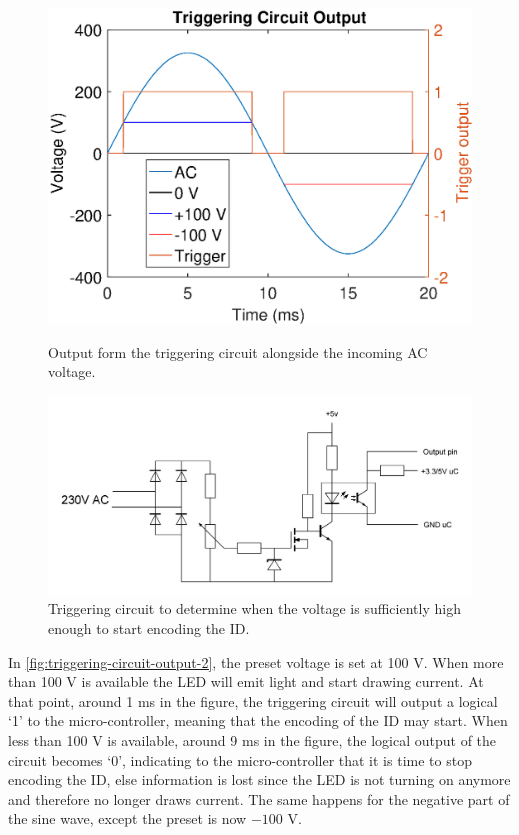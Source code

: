 	\begin{figure}[t]
		\centering
		\begin{minipage}[b]{0.49\textwidth}
			\includegraphics[width=\textwidth]{chapters/hardware-chapters/AC/ac-modulator/custom-hardware/ac-trigger/ac-wave-triggering.eps}
			\caption{Output form the triggering circuit alongside the incoming AC voltage.}
			\label{fig:triggering-circuit-output-2}
		\end{minipage}
		\hfill
		\begin{minipage}[b]{0.49\textwidth}
			\includegraphics[width=\textwidth]{chapters/hardware-chapters/AC/ac-modulator/custom-hardware/ac-trigger/custom-modulator-trigger.JPG}
		    \caption{Triggering circuit to determine when the voltage is sufficiently high enough to start encoding the ID.}
			\label{fig:custom-modulator-trigger}
		\end{minipage}
	\end{figure}

	In \autoref{fig:triggering-circuit-output-2}, the preset voltage is set at 100 V.
	When more than 100 V is available the LED will emit light and start drawing current.
	At that point, around 1 ms in the figure, the triggering circuit will output a logical `1' to the micro-controller, meaning that the encoding of the ID may start.
	When less than 100 V is available, around 9 ms in the figure, the logical output of the circuit becomes `0', indicating to the micro-controller that it is time to stop encoding the ID, else information is lost since the LED is not turning on anymore and therefore no longer draws current.
	The same happens for the negative part of the sine wave, except the preset is now $-100$ V.


